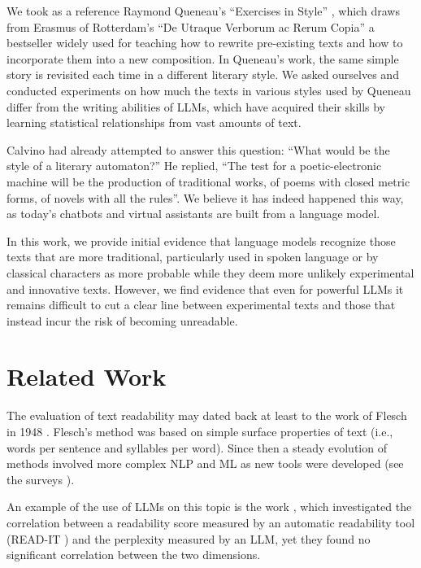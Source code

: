\documentclass[
twocolumn,
]{ceurart}
\begin{document}
We took as a reference Raymond Queneau's ``Exercises in Style'' \cite{queneau1947exercises}, which draws from Erasmus of Rotterdam's ``De Utraque Verborum ac Rerum Copia'' \cite{erasmus1512} a bestseller widely used for teaching how to rewrite pre-existing texts and how to incorporate them into a new composition. 
In Queneau's work, the same simple story is revisited each time in a different literary style. 
We asked ourselves and conducted experiments on how much the texts in various styles used by Queneau differ from the writing abilities of LLMs, which have acquired their skills by learning statistical relationships from vast amounts of text.

Calvino had already attempted to answer this question: ``What would be the style of a literary automaton?''
He replied, ``The test for a poetic-electronic machine will be the production of traditional works, of poems with closed metric forms, of novels with all the rules''. 
We believe it has indeed happened this way, as today's chatbots and virtual assistants are built from a language model.

In this work, we provide initial evidence that language models  recognize those texts that are more traditional, particularly used in spoken language or by classical characters as more probable while they deem more unlikely experimental and innovative texts. However, we find evidence that even for powerful LLMs it remains difficult to cut a clear line between experimental texts and those that instead incur the risk of becoming unreadable. 


\section{Related Work}

The evaluation of text readability may dated back at least to the work of Flesch in 1948 \cite{flesch1948new}. Flesch's method was based on simple surface properties of text (i.e., words per sentence and syllables per word).
Since then a steady evolution of methods involved more complex NLP and ML as new tools were developed (see the surveys \cite{collins2014computational, vajjala2021trends}).

An example of the use of LLMs on this topic is the work \citet{Miaschi20}, which investigated the correlation between a readability score measured by an automatic readability tool (READ-IT \cite{DellOrletta11}) and the perplexity measured by an LLM, yet they found no significant correlation between the two dimensions.
\end{document}

